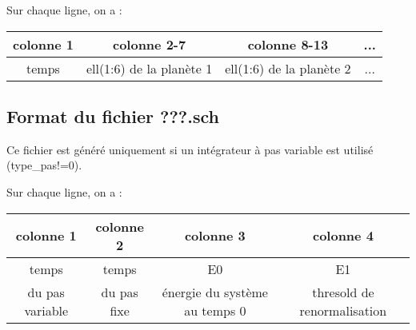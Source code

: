 \documentclass[11pt]{article}
\begin{document}
Sur chaque ligne, on a : 

\begin{tabular}{|c|c|c|c|} \hline
colonne 1 &   colonne 2-7 & colonne 8-13 & ... \\ \hline
temps & ell(1:6) de la plan\`ete 1  & ell(1:6) de la plan\`ete 2 & ... \\    \hline
\end{tabular}

\subsection{Format du fichier {\bf ???.sch} }

Ce fichier est g\'en\'er\'e uniquement si un int\'egrateur \`a pas variable est utilis\'e (type\_pas!=0).
 

Sur chaque ligne, on a : 

\begin{tabular}{|c|c|c|c|} \hline
colonne 1 &   colonne 2& colonne 3 & colonne 4 \\ \hline
temps & temps  & E0  & E1 \\  
 du pas variable & du pas fixe  & \'energie du syst\`eme au temps 0 & thresold de renormalisation \\    \hline
\end{tabular}
\end{document}
